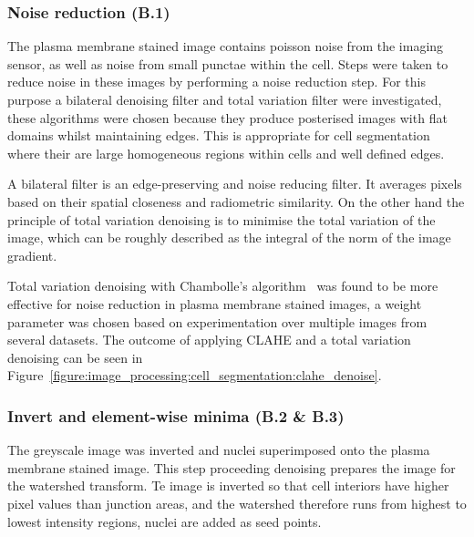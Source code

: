 \subsubsection{Noise reduction (B.1)}
The plasma membrane stained image contains poisson noise from the imaging sensor, as well as noise from small punctae within the cell. Steps were taken to reduce noise in these images by performing a noise reduction step. For this purpose a bilateral denoising filter and total variation filter were investigated, these algorithms were chosen because they produce posterised images with flat domains whilst maintaining edges. This is appropriate for cell segmentation where their are large homogeneous regions within cells and well defined edges.

A bilateral filter is an edge-preserving and noise reducing filter. It averages pixels based on their spatial closeness and radiometric similarity. On the other hand the principle of total variation denoising is to minimise the total variation of the image, which can be roughly described as the integral of the norm of the image gradient.

Total variation denoising with Chambolle's algorithm~\cite{Chambolle2004} was found to be more effective for noise reduction in plasma membrane stained images, a weight parameter was chosen based on experimentation over multiple images from several datasets. The outcome of applying CLAHE and a total variation denoising can be seen in Figure~\ref{figure:image_processing:cell_segmentation:clahe_denoise}.

\subsubsection{Invert and element-wise minima (B.2 \& B.3)}
The greyscale image was inverted and nuclei superimposed onto the plasma membrane stained image. This step proceeding denoising prepares the image for the watershed transform. Te image is inverted so that cell interiors have higher pixel values than junction areas, and the watershed therefore runs from highest to lowest intensity regions, nuclei are added as seed points.

